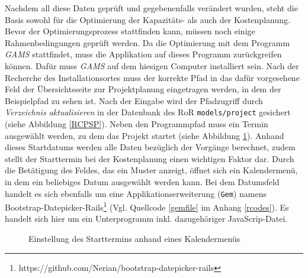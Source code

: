 \documentclass[a4paper,12pt,parskip,bibtotoc,liststotoc]{article}
\begin{document}
Nachdem all diese Daten geprüft und gegebenenfalls verändert wurden, steht die Basis sowohl für die Optimierung der Kapazitäts- als auch der Kostenplanung. Bevor der Optimierungsprozess stattfinden kann, müssen noch einige Rahmenbedingungen geprüft werden. Da die Optimierung mit dem Programm \textit{GAMS} stattfindet, muss die Applikation auf dieses Programm zurückgreifen können. Dafür muss \textit{GAMS} auf dem hiesigen Computer installiert sein. Nach der Recherche des Installationsortes muss der korrekte Pfad in das dafür vorgesehene Feld der Übersichtsseite zur Projektplanung eingetragen werden, in dem der Beispielpfad zu sehen ist. Nach der Eingabe wird der Pfadzugriff durch \textit{Verzeichnis aktualisieren} in der Datenbank des RoR \texttt{models/project} gesichert (siehe Abbildung \ref{RCPSP}). Neben den Programmpfad muss ein Termin ausgewählt werden, zu dem das Projekt startet (siehe Abbildung \ref{Startdatum}). Anhand dieses Startdatums werden alle Daten bezüglich der Vorgänge berechnet, zudem stellt der Starttermin bei der Kostenplanung einen wichtigen Faktor dar. Durch die Betätigung des Feldes, das ein Muster anzeigt, öffnet sich ein Kalendermenü, in dem ein beliebiges Datum ausgewählt werden kann. Bei dem Datumsfeld handelt es sich ebenfalls um eine Applikationserweiterung (\texttt{Gem}) namens \glqq Bootstrap-Datepicker-Rails\grqq\footnote{https://github.com/Nerian/bootstrap-datepicker-rails} (Vgl. Quellcode \ref{gemfile} im Anhang \ref{rcodes}). Es handelt sich hier um ein Unterprogramm inkl. dazugehöriger JavaScrip-Datei. \\  

\begin{figure}[h!]
  \begin{center}
    \caption{Einstellung des Starttermins anhand eines Kalendermenüs}  \label{Startdatum}
  \end{center}
\end{figure}
\end{document}
